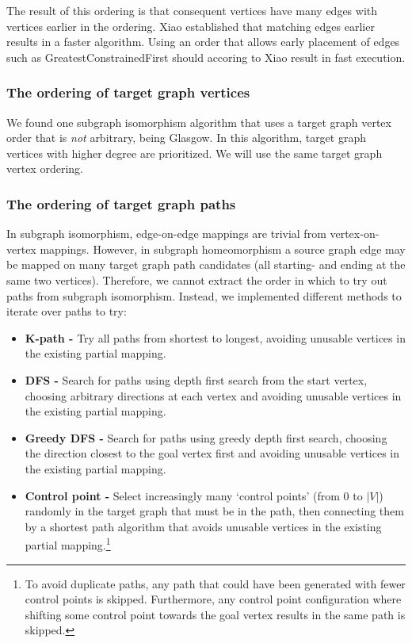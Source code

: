 The result of this ordering is that consequent vertices have many edges with vertices earlier in the ordering. Xiao established that matching edges earlier results in a faster algorithm. Using an order that allows early placement of edges such as GreatestConstrainedFirst should accoring to Xiao result in fast execution.

\subsubsection{The ordering of target graph vertices}
We found one subgraph isomorphism algorithm that uses a target graph vertex order that is \textit{not} arbitrary, being Glasgow\cite{McCreesh2015}. In this algorithm, target graph vertices with higher degree are prioritized. We will use the same target graph vertex ordering.

\subsubsection{The ordering of target graph paths}
In subgraph isomorphism, edge-on-edge mappings are trivial from vertex-on-vertex mappings. However, in subgraph homeomorphism a source graph edge may be mapped on many target graph path candidates (all starting- and ending at the same two vertices). Therefore, we cannot extract the order in which to try out paths from subgraph isomorphism. Instead, we implemented different methods to iterate over paths to try:

\begin{itemize}
\item \textbf{K-path -} Try all paths from shortest to longest, avoiding unusable vertices in the existing partial mapping.
\item \textbf{DFS -} Search for paths using depth first search from the start vertex, choosing arbitrary directions at each vertex and avoiding unusable vertices in the existing partial mapping.
\item \textbf{Greedy DFS -} Search for paths using greedy depth first search, choosing the direction closest to the goal vertex first and avoiding unusable vertices in the existing partial mapping.
\item \textbf{Control point -} Select increasingly many `control points' (from $0$ to $|V|$) randomly in the target graph that must be in the path, then connecting them by a shortest path algorithm that avoids unusable vertices in the existing partial mapping.\footnote{To avoid duplicate paths, any path that could have been generated with fewer control points is skipped. Furthermore, any control point configuration where shifting some control point towards the goal vertex results in the same path is skipped.}
\end{itemize}

